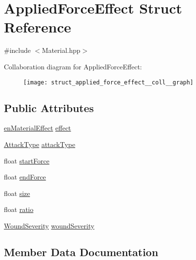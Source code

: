 \hypertarget{struct_applied_force_effect}{}\section{Applied\+Force\+Effect Struct Reference}
\label{struct_applied_force_effect}


{\ttfamily \#include $<$Material.\+hpp$>$}



Collaboration diagram for Applied\+Force\+Effect\+:
\nopagebreak
\begin{figure}[H]
\begin{center}
\leavevmode
\texttt{[image: struct\_applied\_force\_effect\_\_coll\_\_graph]}
\end{center}
\end{figure}
\subsection*{Public Attributes}
\begin{DoxyCompactItemize}
\item 
\mbox{\hyperlink{_material_8hpp_a666cff003097e3165d55b4b1c269a2e6}{en\+Material\+Effect}} \mbox{\hyperlink{struct_applied_force_effect_aa78faf3596c6557107dcd902b0397811}{effect}}
\item 
\mbox{\hyperlink{_enum_types_8hpp_a904b2f9c8f3951116c343784c59d6afe}{Attack\+Type}} \mbox{\hyperlink{struct_applied_force_effect_abf55a5ab31b65c1b6781a863ef7c3b75}{attack\+Type}}
\item 
float \mbox{\hyperlink{struct_applied_force_effect_a041935c570639c9f1f87e34e114f204e}{start\+Force}}
\item 
float \mbox{\hyperlink{struct_applied_force_effect_a59d301bbc9070156ed39cf672b2724bf}{end\+Force}}
\item 
float \mbox{\hyperlink{struct_applied_force_effect_aa50dc7f47801c66dc9df54d8fb281cf0}{size}}
\item 
float \mbox{\hyperlink{struct_applied_force_effect_a01ede7323a840f3f44bc9200e9b8e8f9}{ratio}}
\item 
\mbox{\hyperlink{_enum_types_8hpp_a295be2e2d0f307f31ad832b24a7736c6}{Wound\+Severity}} \mbox{\hyperlink{struct_applied_force_effect_a5aa8b89ec11b997955d4160b3fb671ec}{wound\+Severity}}
\end{DoxyCompactItemize}


\subsection{Member Data Documentation}
\mbox{\label{struct_applied_force_effect_abf55a5ab31b65c1b6781a863ef7c3b75}} 
